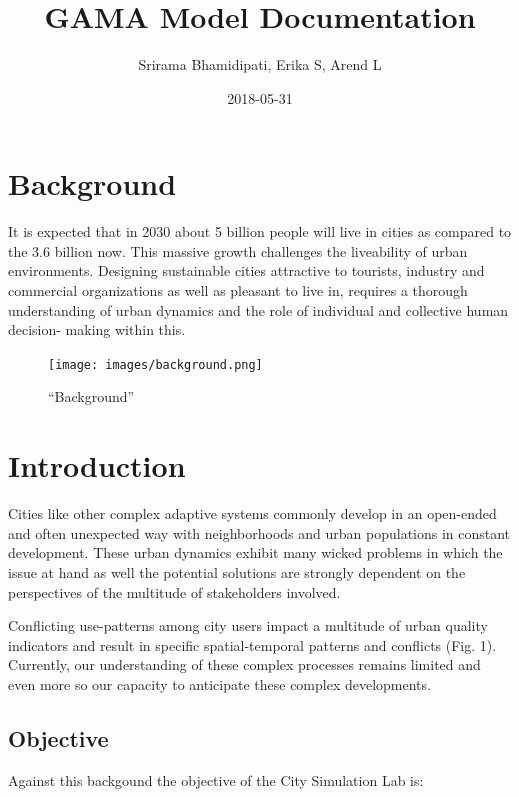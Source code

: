\documentclass[]{book}
\title{GAMA Model Documentation}
\author{Srirama Bhamidipati, Erika S, Arend L}
\date{2018-05-31}
\theoremstyle{definition}
\theoremstyle{definition}
\theoremstyle{definition}
\theoremstyle{remark}
\begin{document}
\maketitle

{
\setcounter{tocdepth}{1}
\tableofcontents
}
\hypertarget{background}{%
\chapter*{Background}\label{background}}

It is expected that in 2030 about 5 billion people will live in cities
as compared to the 3.6 billion now. This massive growth challenges the
liveability of urban environments. Designing sustainable cities
attractive to tourists, industry and commercial organizations as well as
pleasant to live in, requires a thorough understanding of urban dynamics
and the role of individual and collective human decision- making within
this.

\begin{figure}
\centering
\texttt{[image: images/background.png]}
\caption{``Background''}
\end{figure}

\hypertarget{introduction}{%
\chapter{Introduction}\label{introduction}}

Cities like other complex adaptive systems commonly develop in an
open-ended and often unexpected way with neighborhoods and urban
populations in constant development. These urban dynamics exhibit many
wicked problems in which the issue at hand as well the potential
solutions are strongly dependent on the perspectives of the multitude of
stakeholders involved.

Conflicting use-patterns among city users impact a multitude of urban
quality indicators and result in specific spatial-temporal patterns and
conflicts (Fig. 1). Currently, our understanding of these complex
processes remains limited and even more so our capacity to anticipate
these complex developments.

\hypertarget{objective}{%
\section{Objective}\label{objective}}

Against this backgound the objective of the City Simulation Lab is:
\end{document}

